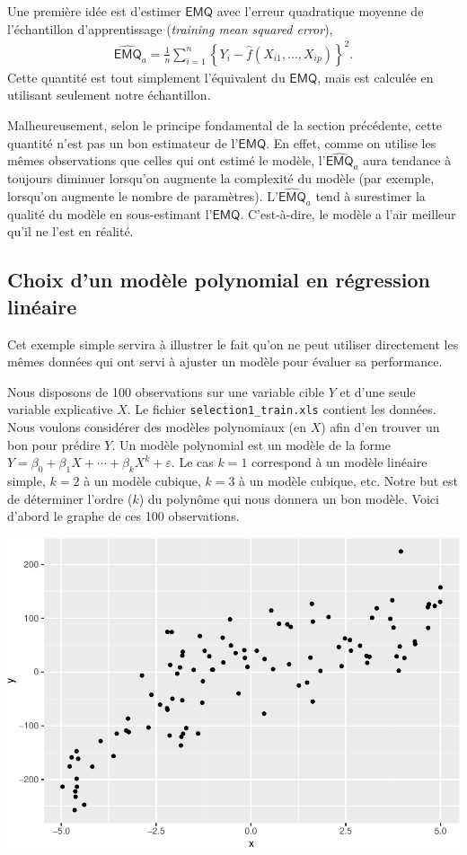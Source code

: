 \documentclass[
  11pt,
  letterpaper,
]{book}
\theoremstyle{definition}
\theoremstyle{definition}
\theoremstyle{definition}
\theoremstyle{remark}
\begin{document}
Une première idée est d'estimer \(\mathsf{EMQ}\) avec l'erreur quadratique moyenne de l'échantillon d'apprentissage (\emph{training mean squared error}),
\begin{align*}
\widehat{\mathsf{EMQ}}_a= \frac{1}{n}\sum_{i=1}^n \left\{Y_i-\widehat{f}(X_{i1}, \ldots, X_{ip})\right\}^2.
\end{align*}
Cette quantité est tout simplement l'équivalent du \(\mathsf{EMQ}\), mais est calculée en utilisant seulement notre échantillon.

Malheureusement, selon le principe fondamental de la section précédente, cette quantité n'est pas un bon estimateur de l'\(\mathsf{EMQ}\). En effet, comme on utilise les mêmes observations que celles qui ont estimé le modèle, l'\(\widehat{\mathsf{EMQ}}_a\) aura tendance à toujours diminuer lorsqu'on augmente la complexité du modèle (par exemple, lorsqu'on augmente le nombre de paramètres). L'\(\widehat{\mathsf{EMQ}}_a\) tend à surestimer la qualité du modèle en sous-estimant l'\(\mathsf{EMQ}\). C'est-à-dire, le modèle a l'air meilleur qu'il ne l'est en réalité.

\hypertarget{choix-dun-moduxe8le-polynomial-en-ruxe9gression-linuxe9aire}{%
\subsection{Choix d'un modèle polynomial en régression linéaire}\label{choix-dun-moduxe8le-polynomial-en-ruxe9gression-linuxe9aire}}

Cet exemple simple servira à illustrer le fait qu'on ne peut utiliser directement les mêmes données qui ont servi à ajuster un modèle pour évaluer sa performance.

Nous disposons de 100 observations sur une variable cible \(Y\) et d'une seule variable explicative \(X\). Le fichier \texttt{selection1\_train.xls} contient les données. Nous voulons considérer des modèles polynomiaux (en \(X\)) afin d'en trouver un bon pour prédire \(Y\). Un modèle polynomial est un modèle de la forme \(Y=\beta_0 + \beta_1X+\cdots+\beta_kX^k+\varepsilon\). Le cas \(k=1\) correspond à un modèle linéaire simple, \(k=2\) à un modèle cubique, \(k=3\) à un modèle cubique, etc. Notre but est de déterminer l'ordre (\(k\)) du polynôme qui nous donnera un bon modèle. Voici d'abord le graphe de ces 100 observations.

\begin{center}\includegraphics[width=0.7\linewidth]{MATH60602_files/figure-latex/02-graphedonneestest-1} \end{center}
\end{document}
